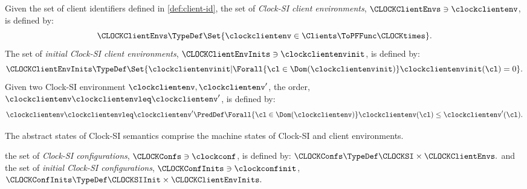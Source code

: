 \begin{definition}
Given the set of client identifiers defined in \cref{def:client-id},
the set of \emph{Clock-SI client environments}, \( \CLOCKClientEnvs \ni \clockclientenv\),
is defined by:
\[
\CLOCKClientEnvs \TypeDef \Set{\clockclientenv \in \Clients \ToPFFunc \CLOCKtimes } .
\]
The set of \emph{initial Clock-SI client environments}, 
\( \CLOCKClientEnvInits \ni \clockclientenvinit\),
is defined by:
\[
    \CLOCKClientEnvInits \TypeDef \Set{\clockclientenvinit 
                | \Forall{\cl \in \Dom(\clockclientenvinit)} \clockclientenvinit(\cl) = 0}.
\]
Given two Clock-SI environment \( \clockclientenv,\clockclientenv'\),
the order, \( \clockclientenv \clockclientenvleq \clockclientenv'\), is defined by:
\[
\clockclientenv \clockclientenvleq \clockclientenv' \PredDef
\Forall{\cl \in \Dom(\clockclientenv)} \clockclientenv(\cl) \leq \clockclientenv'(\cl) .
\]
\end{definition}

The abstract states of Clock-SI semantics comprise the machine states of Clock-SI and client environments.

\begin{definition}
the set of \emph{Clock-SI configurations}, \( \CLOCKConfs \ni \clockconf \), is defined by:
\(
\CLOCKConfs \TypeDef \CLOCKSI \times \CLOCKClientEnvs .
\)
and the set of \emph{initial Clock-SI configurations}, \( \CLOCKConfInits \ni \clockconfinit \),
\( 
\CLOCKConfInits \TypeDef \CLOCKSIInit \times \CLOCKClientEnvInits .
\)
\end{definition}

